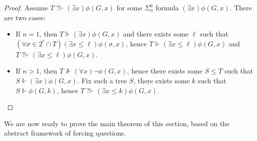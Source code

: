 \documentclass{article}
\def\NN{\mathbb{N}}
\def\TT{\mathbb{T}}
\def\PP{\mathbb{P}}
\def\PP{\mathbb{P}}
\newcommand{\converge}{\!\!\downarrow}
\newcommand{\diverge}{\!\!\uparrow}
\newcommand{\ludovic}[1]{\textcolor{blue}{#1}}
\newcommand{\qvdash}{\operatorname{{?}{\vdash}}}
\newcommand{\nqvdash}{\operatorname{{?}{\nvdash}}}
\numberwithin{theorem}{section}
\newtheorem{lemma}[theorem]{Lemma}
\theoremstyle{definition}
\begin{document}
\begin{proof}
Assume $T \qvdash (\exists x)\phi(G,x)$ for some $\Sigma_n^0$ formula $(\exists x)\phi(G,x)$. There are two cases:
\begin{itemize}
    \item If $n = 1$, then $T \Vdash (\exists x)\phi(G,x)$ and there exists some $\ell$ such that $(\forall \sigma \in 2^{\ell} \cap T)(\exists x \leq \ell) \phi(\sigma,x)$, hence $T \Vdash (\exists x \leq \ell)\phi(G,x)$ and $T \qvdash (\exists x \leq \ell)\phi(G,x)$.
    \item If $n > 1$, then $T \not \Vdash (\forall x) \neg \phi(G,x)$, hence there exists some $S \leq T$ such that $S \Vdash (\exists x) \phi(G,x)$. Fix such a tree $S$, there exists some $k$ such that $S \Vdash \phi(G,k)$, hence $T \qvdash (\exists x \leq k) \phi(G,x)$.
\end{itemize}

\end{proof}

We are now ready to prove the main theorem of this section, based on the abstract framework of forcing questions.


\end{document}
